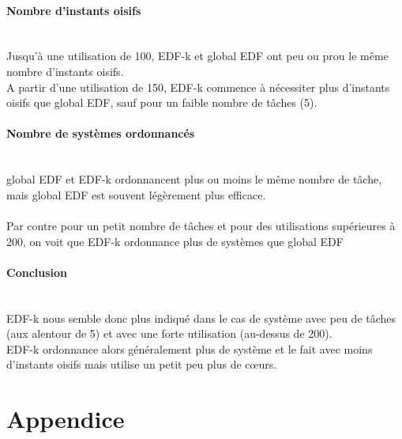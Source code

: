 \documentclass[a4paper,10pt]{article}
\begin{document}
	\paragraph*{Nombre d'instants oisifs}~\\
		Jusqu'à une utilisation de 100, EDF-k et global EDF ont peu ou prou le même nombre d'instants oisifs.\\
		A partir d'une utilisation de 150, EDF-k commence à nécessiter plus d'instants oisifs que global EDF, sauf pour un faible nombre de tâches (5).\\
		
	\paragraph*{Nombre de systèmes ordonnancés}~\\
		global EDF et EDF-k ordonnancent plus ou moins le même nombre de tâche, mais global EDF est souvent légèrement plus efficace.\\
		~\\
		Par contre pour un petit nombre de tâches et pour des utilisations supérieures à 200, on voit que EDF-k ordonnance plus de systèmes que global EDF
		
	\paragraph*{Conclusion}~\\
		EDF-k nous semble donc plus indiqué dans le cas de système avec peu de tâches (aux alentour de 5) et avec une forte utilisation (au-dessus de 200).\\
		EDF-k ordonnance alors généralement plus de système et le fait avec moins d'instants oisifs mais utilise un petit peu plus de cœurs.

\pagebreak
\section{Appendice}
	
\end{document}

